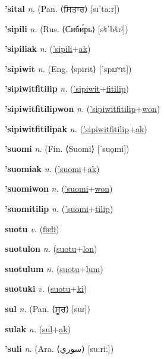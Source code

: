 \textbf{\hypertarget{'sital}{'sital}} \textit{n.} (Pan. ⟨{\gurmukhi{}ਸਿਤਾਰ}⟩ [sɪˈtaːr])


\textbf{\hypertarget{'sipili}{'sipili}} \textit{n.} (Rus. ⟨Сиби́рь⟩ [sʲɪˈbʲirʲ])


\textbf{\hypertarget{'sipiliak}{'sipiliak}} \textit{n.} (\hyperlink{'sipili}{'sipili}+\allowbreak \hyperlink{ak}{ak})


\textbf{\hypertarget{'sipiwit}{'sipiwit}} \textit{n.} (Eng. ⟨spirit⟩ [ˈspɪɹʷɪt])


\textbf{\hypertarget{'sipiwitfitilip}{'sipiwitfitilip}} \textit{n.} (\hyperlink{'sipiwit}{'sipiwit}+\allowbreak \hyperlink{fitilip}{fitilip})


\textbf{\hypertarget{'sipiwitfitilipwon}{'sipiwitfitilipwon}} \textit{n.} (\hyperlink{'sipiwitfitilip}{'sipiwitfitilip}+\allowbreak \hyperlink{won}{won})


\textbf{\hypertarget{'sipiwitfitilipak}{'sipiwitfitilipak}} \textit{n.} (\hyperlink{'sipiwitfitilip}{'sipiwitfitilip}+\allowbreak \hyperlink{ak}{ak})


\textbf{\hypertarget{'suomi}{'suomi}} \textit{n.} (Fin. ⟨Suomi⟩ [ˈsuo̯mi])


\textbf{\hypertarget{'suomiak}{'suomiak}} \textit{n.} (\hyperlink{'suomi}{'suomi}+\allowbreak \hyperlink{ak}{ak})


\textbf{\hypertarget{'suomiwon}{'suomiwon}} \textit{n.} (\hyperlink{'suomi}{'suomi}+\allowbreak \hyperlink{won}{won})


\textbf{\hypertarget{'suomitilip}{'suomitilip}} \textit{n.} (\hyperlink{'suomi}{'suomi}+\allowbreak \hyperlink{tilip}{tilip})


\textbf{\hypertarget{suotu}{suotu}} \textit{v.} (\hyperlink{fieli}{\sout{fieli}})


\textbf{\hypertarget{suotulon}{suotulon}} \textit{n.} (\hyperlink{suotu}{suotu}+\allowbreak \hyperlink{lon}{lon})


\textbf{\hypertarget{suotulum}{suotulum}} \textit{n.} (\hyperlink{suotu}{suotu}+\allowbreak \hyperlink{lum}{lum})


\textbf{\hypertarget{suotuki}{suotuki}} \textit{v.} (\hyperlink{suotu}{suotu}+\allowbreak \hyperlink{ki}{ki})


\textbf{\hypertarget{sul}{sul}} \textit{n.} (Pan. ⟨{\gurmukhi{}ਸੂਰ}⟩ [suɾ])


\textbf{\hypertarget{sulak}{sulak}} \textit{n.} (\hyperlink{sul}{sul}+\allowbreak \hyperlink{ak}{ak})


\textbf{\hypertarget{'suli}{'suli}} \textit{n.} (Ara. ⟨{\arabics{}سوري‎}⟩ [suːriː])


